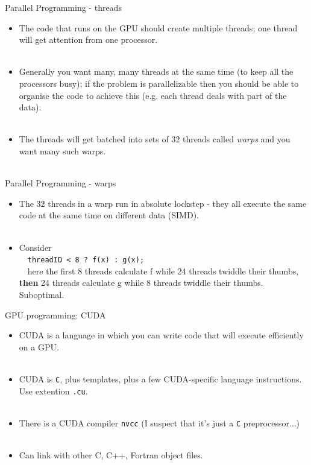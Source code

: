 \documentclass[usenames,dvipsnames]{beamer}
\begin{document}
\begin{frame}{Parallel Programming - threads}
  \begin{block}{}
    \begin{itemize}
      \item{The code that runs on the GPU should create multiple threads; one thread will get attention from one processor.}\\~\
      \item{Generally you want many, many threads at the same time (to keep all the processors busy); if the problem is parallelizable then you should be able to organise the code to achieve this (e.g. each thread deals with part of the data).}\\~\
      \item{The threads will get batched into sets of 32 threads called \textit{warps} and you want many such warps.}\\~\
    \end{itemize}
  \end{block}
\end{frame}

\begin{frame}{Parallel Programming - warps}
  \begin{block}{}
    \begin{itemize}
      \item{The 32 threads in a warp run in absolute lockstep - they all execute the same code at the same time on different data (SIMD).}\\~\
      \item{Consider\\~\ \texttt{threadID < 8 ? f(x) : g(x);}\\~\ \noindent here the first 8 threads calculate f while 24 threads twiddle their thumbs, \textbf{then} 24 threads calculate g while 8 threads twiddle their thumbs. Suboptimal.}
    \end{itemize}
  \end{block}
\end{frame}

\begin{frame}{GPU programming: CUDA}
  \begin{block}{}
    \begin{itemize}
      \item{CUDA is a language in which you can write code that will execute efficiently on a GPU.}\\~\
      \item{CUDA is \texttt{C}, plus templates, plus a few CUDA-specific language instructions. Use extention \texttt{.cu}.}\\~\
      \item{There is a CUDA compiler \texttt{nvcc} (I suspect that it's just a \texttt{C} preprocessor...)}\\~\
      \item{Can link with other C, C++, Fortran object files.}\\~\
    \end{itemize}
  \end{block}
\end{frame}
\end{document}

